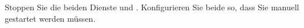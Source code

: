 \item Stoppen Sie die beiden Dienste  und .
Konfigurieren Sie beide so, dass Sie manuell gestartet werden müssen.
